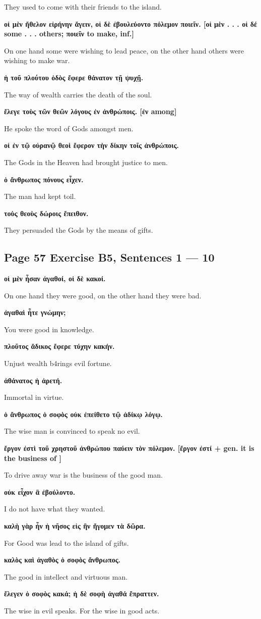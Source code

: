 They used to come with their friends to the island.

\noindent\textbf{οἱ μὲν ἤθελον εἰρήνην ἄγειν, οἱ δὲ ἐβουλεύοντο πόλεμον ποιεῖν. [οἱ μὲν . . . οἱ δέ some . . . others; ποιεῖν to make, inf.]}

On one hand some were wishing to lead peace, on the other hand others were wishing to make war.

\noindent\textbf{ἡ τοῦ πλούτου ὁδὸς ἔφερε θάνατον τῇ ψυχῇ.}

The way of wealth carries the death of the soul.

\noindent\textbf{ἔλεγε τοὺς τῶν θεῶν λόγους ἐν ἀνθρώποις. [ἐν among]}

He spoke the word of Gods amongst men.

\noindent\textbf{οἱ ἐν τῷ οὐρανῷ θεοὶ ἔφερον τὴν δίκην τοῖς ἀνθρώποις.}

The Gods in the Heaven had brought justice to men.

\noindent\textbf{ὁ ἄνθρωπος πόνους εἶχεν.}

The man had kept toil.

\noindent\textbf{τοὺς θεοὺς δώροις ἔπειθον.}

They persuaded the Gods by the means of gifts.

\subsection*{Page 57 Exercise B5, Sentences 1 --- 10}
\noindent\textbf{οἱ μὲν ἦσαν ἀγαθοί, οἱ δὲ κακοί.}

On one hand they were good, on the other hand they were bad.

\noindent\textbf{ἀγαθαὶ ἦτε γνώμην;}

You were good in knowledge.

\noindent\textbf{πλοῦτος ἄδικος ἔφερε τύχην κακήν.}

Unjust wealth b4rings evil fortune.

\noindent\textbf{ἀθάνατος ἡ ἀρετή.}

Immortal in virtue.

\noindent\textbf{ὁ ἄνθρωπος ὁ σοφὸς οὐκ ἐπείθετο τῷ ἀδίκῳ λόγῳ.}

The wise man is convinced to speak no evil.

\noindent\textbf{ἔργον ἐστὶ τοῦ χρηστοῦ ἀνθρώπου παύειν τὸν πόλεμον. [ἔργον ἐστί + gen. it is the business of ]}

To drive away war is the business of the good man.

\noindent\textbf{οὐκ εἶχον ἃ ἐβούλοντο.}

I do not have what they wanted.

\noindent\textbf{καλὴ γὰρ ἦν ἡ νῆσος εἰς ἣν ἤγομεν τὰ δῶρα.}

For Good was lead to the island of gifts.

\noindent\textbf{καλὸς καὶ ἀγαθὸς ὁ σοφὸς ἄνθρωπος.}

The good in intellect and virtuous man.

\noindent\textbf{ἔλεγεν ὁ σοφὸς κακά; ἡ δὲ σοφὴ ἀγαθά ἔπραττεν.}

The wise in evil speaks. For the wise in good acts.
